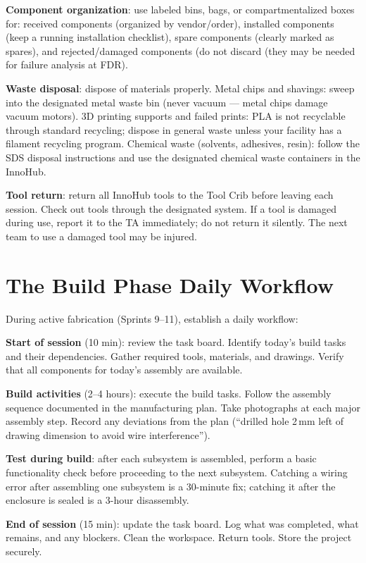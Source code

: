 \textbf{Component organization}: use labeled bins, bags, or compartmentalized boxes for: received components (organized by vendor/order), installed components (keep a running installation checklist), spare components (clearly marked as spares), and rejected/damaged components (do not discard (they may be needed for failure analysis at FDR).

\textbf{Waste disposal}: dispose of materials properly. Metal chips and shavings: sweep into the designated metal waste bin (never vacuum --- metal chips damage vacuum motors). 3D printing supports and failed prints: PLA is not recyclable through standard recycling; dispose in general waste unless your facility has a filament recycling program. Chemical waste (solvents, adhesives, resin): follow the SDS disposal instructions and use the designated chemical waste containers in the InnoHub.

\textbf{Tool return}: return all InnoHub tools to the Tool Crib before leaving each session. Check out tools through the designated system. If a tool is damaged during use, report it to the TA immediately; do not return it silently. The next team to use a damaged tool may be injured.



\section{The Build Phase Daily Workflow}
During active fabrication (Sprints 9--11), establish a daily workflow:

\textbf{Start of session} (10 min): review the task board. Identify today's build tasks and their dependencies. Gather required tools, materials, and drawings. Verify that all components for today's assembly are available.

\textbf{Build activities} (2--4 hours): execute the build tasks. Follow the assembly sequence documented in the manufacturing plan. Take photographs at each major assembly step. Record any deviations from the plan (``drilled hole 2\,mm left of drawing dimension to avoid wire interference'').

\textbf{Test during build}: after each subsystem is assembled, perform a basic functionality check before proceeding to the next subsystem. Catching a wiring error after assembling one subsystem is a 30-minute fix; catching it after the enclosure is sealed is a 3-hour disassembly.

\textbf{End of session} (15 min): update the task board. Log what was completed, what remains, and any blockers. Clean the workspace. Return tools. Store the project securely.

